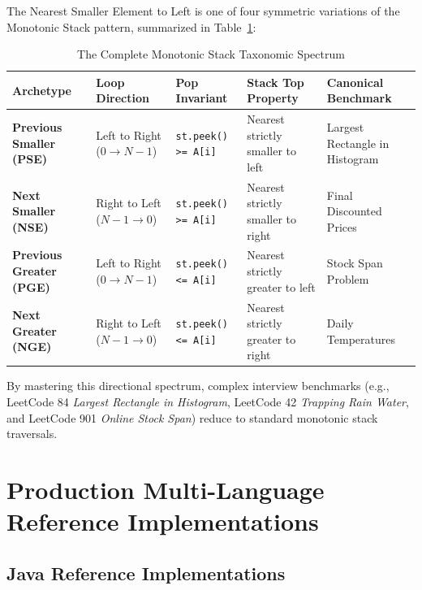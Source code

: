 \documentclass[10pt,journal,compsoc,onecolumn]{IEEEtran}
\begin{document}
The Nearest Smaller Element to Left is one of four symmetric variations of the Monotonic Stack pattern, summarized in Table~\ref{tab:spectrum}:

\begin{table}[h]
\centering
\caption{The Complete Monotonic Stack Taxonomic Spectrum}
\label{tab:spectrum}
\begin{tabular}{@{}p{3.2cm}p{3.0cm}p{3.5cm}p{3.5cm}p{2.8cm}@{}}
\toprule
\textbf{Archetype} & \textbf{Loop Direction} & \textbf{Pop Invariant} & \textbf{Stack Top Property} & \textbf{Canonical Benchmark} \\ \midrule
\textbf{Previous Smaller (PSE)} & Left to Right ($0 \to N-1$) & \texttt{st.peek() >= A[i]} & Nearest strictly smaller to left & Largest Rectangle in Histogram \\
\textbf{Next Smaller (NSE)} & Right to Left ($N-1 \to 0$) & \texttt{st.peek() >= A[i]} & Nearest strictly smaller to right & Final Discounted Prices \\
\textbf{Previous Greater (PGE)} & Left to Right ($0 \to N-1$) & \texttt{st.peek() <= A[i]} & Nearest strictly greater to left & Stock Span Problem \\
\textbf{Next Greater (NGE)} & Right to Left ($N-1 \to 0$) & \texttt{st.peek() <= A[i]} & Nearest strictly greater to right & Daily Temperatures \\ \bottomrule
\end{tabular}
\end{table}

By mastering this directional spectrum, complex interview benchmarks (e.g., LeetCode 84 \emph{Largest Rectangle in Histogram}, LeetCode 42 \emph{Trapping Rain Water}, and LeetCode 901 \emph{Online Stock Span}) reduce to standard monotonic stack traversals.

\section{Production Multi-Language Reference Implementations}
\label{sec:implementations}

\subsection{Java Reference Implementations}
\end{document}
